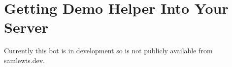 
\section{Getting Demo Helper Into Your Server}
Currently this bot is in development so is not publicly available from samlewis.dev.
